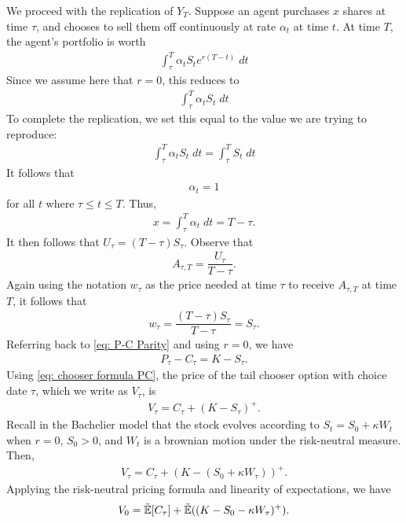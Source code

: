 \documentclass[reqno]{amsart}
\begin{document}
We proceed with the replication of $Y_T$. Suppose an agent purchases $x$ shares at time $\tau$, and chooses to sell them off continuously at rate $\alpha_t$ at time $t$.
At time $T$, the agent's portfolio is worth
\begin{align}
     \int_\tau^T \alpha_t S_t e^{r(T-t)} \;dt
\end{align}
Since we assume here that $r=0$, this reduces to
\begin{align}
     \int_\tau^T \alpha_t S_t \;dt
\end{align}
To complete the replication, we set this equal to the value we are trying to reproduce:
\begin{align}
     \int_\tau^T \alpha_t S_t \;dt = \int_\tau^T S_t \;dt
\end{align}
It follows that
\begin{align}
     \alpha_t = 1
\end{align}
for all $t$ where $\tau \leq t \leq T$. Thus,
\begin{align}
     x = \int_\tau^T \alpha_t \;dt = T - \tau.
\end{align}
It then follows that $U_\tau = (T - \tau) S_\tau$. Observe that 
\begin{align}
     A_{\tau, T} = \dfrac{U_\tau}{T - \tau}.
\end{align}
Again using the notation $w_\tau$ as the price needed at time $\tau$ to receive $A_{\tau, T}$ at time $T$, it follows that
\begin{align}
     w_\tau = \dfrac{(T - \tau) S_\tau}{T - \tau} = S_\tau.
\end{align}
Referring back to \eqref{eq: P-C Parity} and using $r = 0$, we have
\begin{align}
     P_\tau - C_\tau = K - S_\tau.
\end{align}
Using \eqref{eq: chooser formula PC}, the price of the tail chooser option with choice date $\tau$, which we write as $V_\tau$, is
\begin{align}
     V_\tau = C_\tau + (K - S_\tau)^+.
\end{align}
Recall in the Bachelier model that the stock evolves according to $S_t = S_0 + \kappa W_t$ when $r = 0$, $S_0 > 0$, and $W_t$ is a brownian motion under the risk-neutral measure. Then,
\begin{align}
     V_\tau = C_\tau + (K - (S_0 + \kappa W_\tau))^+.
\end{align}
Applying the risk-neutral pricing formula and linearity of expectations, we have
\begin{align} \label{eq: expect form}
     V_0 = \tilde{\mathbb{E}}[C_\tau] + \tilde{\mathbb{E}}((K - S_0 - \kappa W_\tau)^+).
\end{align}
\end{document}
